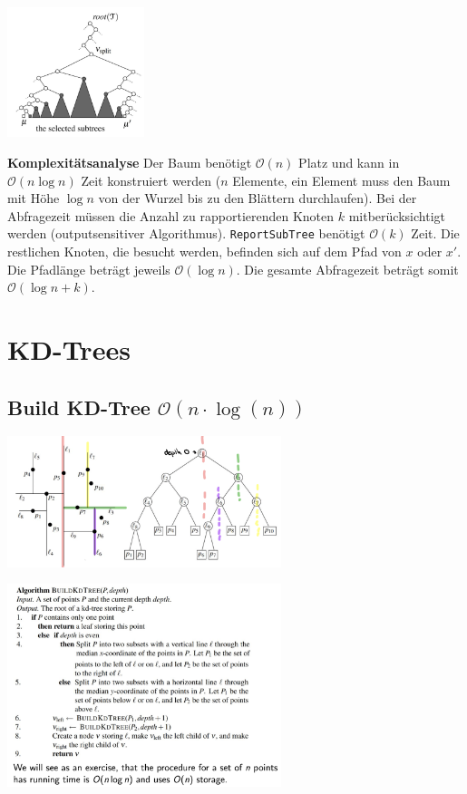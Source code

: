 \documentclass[10pt,a4paper,twocolumn]{article}
\begin{document}
\begin{center}
	\includegraphics[width=4cm]{images/find-split-node-example}
\end{center}

\textbf{Komplexitätsanalyse}
Der Baum benötigt $\mathcal{O}(n)$ Platz und kann in $\mathcal{O}(n\log{n})$ Zeit konstruiert werden ($n$ Elemente, ein Element muss den Baum mit Höhe $\log{n}$ von der Wurzel bis zu den Blättern durchlaufen). Bei der Abfragezeit müssen die Anzahl zu rapportierenden Knoten $k$ mitberücksichtigt werden (outputsensitiver Algorithmus). \verb+ReportSubTree+ benötigt $\mathcal{O}(k)$ Zeit. Die restlichen Knoten, die besucht werden, befinden sich auf dem Pfad von $x$ oder $x'$. Die Pfadlänge beträgt jeweils $\mathcal{O}(\log{n})$. Die gesamte Abfragezeit beträgt somit $\mathcal{O}(\log{n}+k)$.


\section{KD-Trees}

\subsection{Build KD-Tree $\mathcal{O}(n \cdot \log(n))$}
\begin{center}
	\includegraphics[width=8cm]{images/example-build-kdtree}
\end{center}

\begin{center}
	\includegraphics[width=8cm]{images/pseudo-kdtree}
\end{center}
\end{document}
